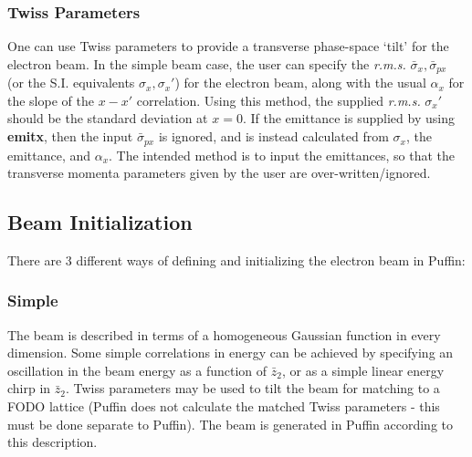 \documentclass[12pt]{article}%
\begin{document}
\subsubsection{Twiss Parameters}

\label{section-twiss}

One can use Twiss parameters to provide a transverse phase-space `tilt' for the electron beam. In the simple beam case, the user can specify the \textit{r.m.s.} $\bar{\sigma}_x, \bar{\sigma}_{px}$ (or the S.I. equivalents $\sigma_x, \sigma_{x}'$) for the electron beam, along with the usual $\alpha_x$ for the slope of the $x-x'$ correlation. Using this method, the supplied \textit{r.m.s.} $\sigma_{x}'$ should be the standard deviation at $x=0$. If the emittance is supplied by using {\bf emitx}, then the input $\bar{\sigma}_{px}$ is ignored, and is instead calculated from $\sigma_x$, the emittance, and $\alpha_x$. The intended method is to input the emittances, so that the transverse momenta parameters given by the user are over-written/ignored.















\subsection{Beam Initialization}
\label{beamfls}
There are 3 different ways of defining and initializing the electron beam in Puffin:

\subsubsection{Simple}

The beam is described in terms of a homogeneous Gaussian function in every dimension. Some simple correlations in energy can be achieved by specifying an oscillation in the beam energy as a function of $\bar{z}_2$, or as a simple linear energy chirp in $\bar{z}_2$. Twiss parameters may be used to tilt the beam for matching to a FODO lattice (Puffin does not calculate the matched Twiss parameters - this must be done separate to Puffin). The beam is generated in Puffin according to this description.
\end{document}
